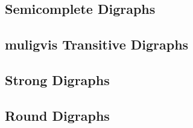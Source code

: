 \subsection{Semicomplete Digraphs}
\subsection{muligvis Transitive Digraphs}
\subsection{Strong Digraphs}
\subsection{Round Digraphs}



